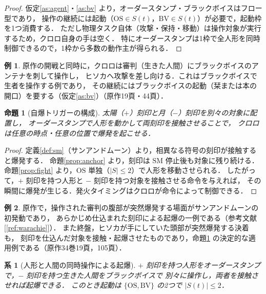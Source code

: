 \documentclass[a4paper,12pt]{jarticle}
\theoremstyle{definition}
\theoremstyle{plain}
\newtheorem{prop}{命題}
\newtheorem{cor}{系}
\theoremstyle{definition}
\newtheorem{ex}{例}
\theoremstyle{remark}
\newcommand{\Act}{S}   %
\newcommand{\OS}{\mathrm{OS}}    %
\newcommand{\BV}{\mathrm{BV}}    %
\newcommand{\SM}{\mathrm{SM}}    %
\begin{document}
\begin{proof}
仮定\ref{as:agent}・\ref{as:bv} より，オーダースタンプ・ブラックボイスはフロー型であり，
操作の継続には起動（$\OS\in\Act(t)$，$\BV\in\Act(t)$）が必要で，起動枠を1つ消費する．
ただし物理タスク自体（攻撃・保持・移動）は操作対象が実行するため，クロロ自身の手は空く．
特にオーダースタンプは1枠で全人形を同時制御できるので，1枠から多数の動作主が得られる．
\end{proof}

\begin{ex}
原作の開戦と同時に，クロロは審判（生きた人間）にブラックボイスのアンテナを刺して操作し，
ヒソカへ攻撃を差し向ける．これはブラックボイスで生者を操作する例であり，
その継続にはブラックボイスの起動（栞または本の開口）を要する（仮定\ref{as:bv}）（原作19頁・44頁）．
\end{ex}

\begin{prop}[自爆トリガーの構成]\label{prop:bomb}
太陽（$+$）刻印と月（$-$）刻印を別々の対象に配置し，
オーダースタンプで人形を動かして両刻印を接触させることで，
クロロは任意の時点・任意の位置で爆発を起こせる．
\end{prop}

\begin{proof}
定義\ref{def:sm}（サンアンドムーン）より，相異なる符号の刻印が接触すると爆発する．
命題\ref{prop:anchor} より，刻印は $\SM$ 停止後も対象に残り続ける．
命題\ref{prop:fight} より，$\OS$ 単独（$|\Act|\le2$）で人形を移動させられる．
したがって，$+$ 刻印を持つ人形と $-$ 刻印を持つ対象を接触させる命令を与えれば，
その瞬間に爆発が生じる．発火タイミングはクロロが命令によって制御できる．
\end{proof}

\begin{ex}
原作で，操作された審判の腹部が突然爆発する場面がサンアンドムーンの初発動であり，
あらかじめ仕込まれた刻印による起爆の一例である（参考文献[\ref{ref:warachie}]）．
また終盤，ヒソカが手にしていた頭部が突然爆発する決着も，
刻印を仕込んだ対象を接触・起爆させたものであり，命題\ref{prop:bomb} の決定的な適用例である（原作34巻19頁，105頁）．
\end{ex}

\begin{cor}[人形と人間の同時操作による起爆]\label{cor:dualbomb}
$+$ 刻印を持つ人形をオーダースタンプで，$-$ 刻印を持つ生きた人間をブラックボイスで
別々に操作し，両者を接触させれば起爆できる．
このとき起動は $\{\OS,\BV\}$ の2つで $|\Act(t)|\le2$．
\end{cor}
\end{document}
